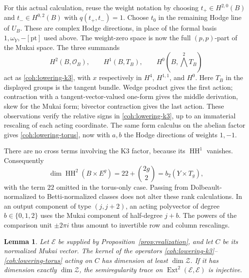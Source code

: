 \documentclass[11pt]{article}
\numberwithin{equation}{section}
\newtheorem{lemma}[theorem]{Lemma}
\theoremstyle{definition}
\theoremstyle{remark}
\newcommand{\cO}{\mathcal O}
\DeclareMathOperator{\HH}{HH}
\DeclareMathOperator{\Ext}{Ext}
\begin{document}
For this actual calculation, reuse the weight notation by choosing
\(t_+\in H^{2,0}(B)\) and
\(t_-\in H^{0,2}(B)\) with \(q(t_+,t_-)=1\).
Choose \(t_0\) in the remaining Hodge line of \(U_B\).
These are complex Hodge directions, in place of the formal basis
\(1,\omega_Y,-[\mathrm{pt}]\) used above.  The weight-zero space is
now the full \((p,p)\)-part of the Mukai space.  The three summands
\[
 H^2(B,\cO_B),\qquad H^1(B,T_B),\qquad
 H^0(B,\bigwedge^2 T_B)
\]
act as \eqref{coh:lowering-k3}, with \(x\) respectively in
\(H^4\), \(H^{1,1}\), and \(H^0\).  Here \(T_B\) in the displayed
groups is the tangent bundle.  Wedge product gives the first action;
contraction with a tangent-vector-valued one-form gives the middle
derivation, skew for the Mukai form; bivector contraction gives the
last action.  These observations verify the relative signs in
\eqref{coh:lowering-k3}, up to an immaterial rescaling of each acting
coordinate.  The same form calculus on the abelian factor gives
\eqref{coh:lowering-torus}, now with \(a,b\) the Hodge directions of
weights \(1,-1\).

There are no cross terms involving the K3 factor, because its
\(\HH^1\) vanishes.  Consequently
\begin{equation}\label{coh:hh-dimension}
 \dim\HH^2(B\times E^g)=22+\binom{2g}{2}=b_2(Y\times T_g),
\end{equation}
with the term \(22\) omitted in the torus-only case.  Passing from
Dolbeault-normalized to Betti-normalized classes does not alter these
rank calculations.  In an output component of type \((j,j+2)\), an
acting polyvector of degree \(b\in\{0,1,2\}\) uses the Mukai
component of half-degree \(j+b\).  The powers of the comparison unit
\(\pm2\pi i\) thus amount to invertible row and column rescalings.

\begin{lemma}\label{coh:rank-trace}
Let \(\mathcal E\) be supplied by
Proposition~\ref{prop:realization}, and let \(C\) be its normalized
Mukai vector.  The kernel of the operators
\eqref{coh:lowering-k3}--\eqref{coh:lowering-torus} acting on \(C\)
has dimension at least \(\dim\mathcal Z\).  If it has dimension
exactly \(\dim\mathcal Z\), the semiregularity trace on
\(\Ext^2(\mathcal E,\mathcal E)\) is injective.
\end{lemma}
\end{document}
